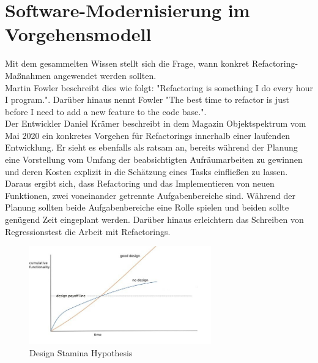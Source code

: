\pagebreak

\section{Software-Modernisierung im Vorgehensmodell}
Mit dem gesammelten Wissen stellt sich die Frage, wann konkret Refactoring-Maßnahmen angewendet werden sollten. \\
Martin Fowler beschreibt dies wie folgt: "Refactoring is something I do every hour I program.". Darüber hinaus nennt Fowler "The best time to refactor is just before I need to add a new feature to the code base.". \cite{fowler_refactoring_2018}\\
Der Entwickler Daniel Krämer beschreibt in dem Magazin Objektspektrum vom Mai 2020 ein konkretes Vorgehen für Refactorings innerhalb einer laufenden Entwicklung. 
Er sieht es ebenfalls als ratsam an, bereits während der Planung eine Vorstellung vom Umfang der beabsichtigten Aufräumarbeiten zu gewinnen und deren Kosten explizit in die Schätzung eines Tasks einfließen zu lassen.\\
Daraus ergibt sich, dass Refactoring und das Implementieren von neuen Funktionen, zwei voneinander getrennte Aufgabenbereiche sind. Während der Planung sollten beide Aufgabenbereiche eine Rolle spielen und beiden sollte genügend Zeit eingeplant werden. Darüber hinaus erleichtern das Schreiben von Regressionstest die Arbeit mit Refactorings.  \cite{daniel_kramer_legacy-software_2020}\cite{fowler_refactoring_2018}


\begin{figure}[bth] 
  \centering
  \includegraphics[width=0.7\textwidth]{Chapters/4-Refactoring/images/DesignStaminaHypothesis.jpg}
  \caption{Design Stamina Hypothesis \cite{fowler_refactoring_2018}}
  \label{fig:stamina}
\end{figure}


